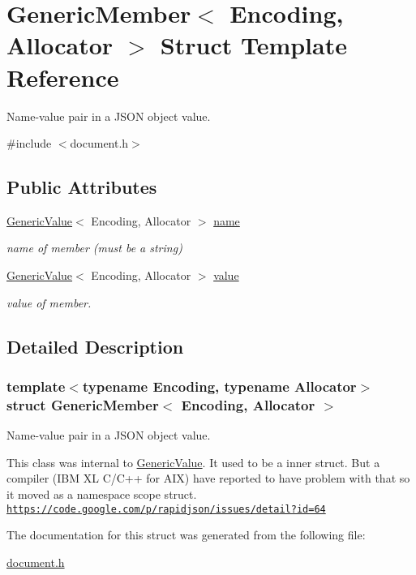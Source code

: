 \hypertarget{a02000}{}\section{Generic\+Member$<$ Encoding, Allocator $>$ Struct Template Reference}
\label{a02000}


Name-\/value pair in a J\+S\+ON object value.  




{\ttfamily \#include $<$document.\+h$>$}

\subsection*{Public Attributes}
\begin{DoxyCompactItemize}
\item 
\mbox{\label{a02000_a7124f7ccd67421533d33139938604fac}} 
\hyperlink{a01992}{Generic\+Value}$<$ Encoding, Allocator $>$ \hyperlink{a02000_a7124f7ccd67421533d33139938604fac}{name}
\begin{DoxyCompactList}\small\item\em name of member (must be a string) \end{DoxyCompactList}\item 
\mbox{\label{a02000_aad3cfa4f9e8b9018068c8bc865723083}} 
\hyperlink{a01992}{Generic\+Value}$<$ Encoding, Allocator $>$ \hyperlink{a02000_aad3cfa4f9e8b9018068c8bc865723083}{value}
\begin{DoxyCompactList}\small\item\em value of member. \end{DoxyCompactList}\end{DoxyCompactItemize}


\subsection{Detailed Description}
\subsubsection*{template$<$typename Encoding, typename Allocator$>$\newline
struct Generic\+Member$<$ Encoding, Allocator $>$}

Name-\/value pair in a J\+S\+ON object value. 

This class was internal to \hyperlink{a01992}{Generic\+Value}. It used to be a inner struct. But a compiler (I\+BM XL C/\+C++ for A\+IX) have reported to have problem with that so it moved as a namespace scope struct. \href{https://code.google.com/p/rapidjson/issues/detail?id=64}{\tt https\+://code.\+google.\+com/p/rapidjson/issues/detail?id=64} 

The documentation for this struct was generated from the following file\+:\begin{DoxyCompactItemize}
\item 
\hyperlink{a00476}{document.\+h}\end{DoxyCompactItemize}
